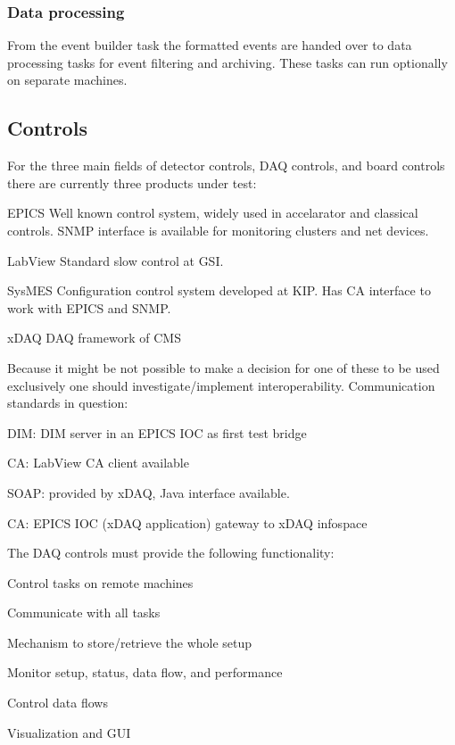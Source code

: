 \subsubsection{Data processing}
From the event builder task the formatted events are handed over
to data processing tasks for event filtering and archiving. These
tasks can run optionally on separate machines.
\subsection{Controls}
For the three main fields of detector controls, DAQ controls, and board controls
there are currently three products under test:
\begin{compactdesc}
\item[EPICS] Well known control system, widely used in accelarator and classical controls.
SNMP interface is available for monitoring clusters and net devices.
\item[LabView] Standard slow control at GSI.
\item[SysMES] Configuration control system developed at KIP. Has CA interface to work with
EPICS and SNMP.
\item[xDAQ] DAQ framework of CMS
\end{compactdesc}
Because it might be not possible to make a decision for one of these to be used exclusively
one should investigate/implement interoperability.
Communication standards in question:
\begin{compactitem}
\item DIM: DIM server in an EPICS IOC as first test bridge
\item CA: LabView CA client available
\item SOAP: provided by xDAQ, Java interface available.
\item CA: EPICS IOC (xDAQ application) gateway to xDAQ infospace
\end{compactitem}
The DAQ controls must provide the following functionality:
\begin{compactitem}
\item Control tasks on remote machines
\item Communicate with all tasks
\item Mechanism to store/retrieve the whole setup
\item Monitor setup, status, data flow, and performance
\item Control data flows
\item Visualization and GUI
\end{compactitem}
